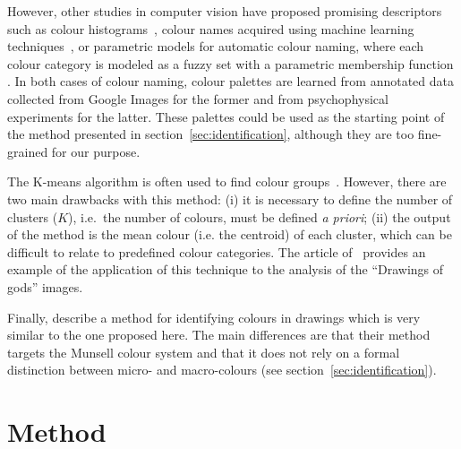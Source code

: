 \documentclass[11pt,a4paper]{article}
\begin{document}
However, other studies in computer vision have proposed promising descriptors such as colour histograms~\cite[see e.g.][]{sun2006}, colour names acquired using machine learning techniques~\cite{weijer2009, lindner2013}, or parametric models for automatic colour naming, where each colour category is modeled as a fuzzy set with a parametric membership function \cite{benavente2008}. In both cases of colour naming, colour palettes are learned from annotated data collected from Google Images for the former and from psychophysical experiments for the latter. These palettes could be used as the starting point of the method presented in section~\ref{sec:identification}, although they are too fine-grained for our purpose.

The K-means algorithm is often used to find colour groups~\cite[see e.g.][]{yendrikhovskij2001,konyushkova2015,hulee2007}. However, there are two main drawbacks with this method: (i) it is necessary to define the number of clusters ($K$), i.e.~the number of colours, must be defined \textit{a priori}; (ii) the output of the method is the mean colour (i.e. the centroid) of each cluster, which can be difficult to relate to predefined colour categories. The article of~\citet{konyushkova2015} provides an example of the application of this technique to the analysis of the ``Drawings of gods'' images.

Finally, \citet{kimbaelee2007} describe a method for identifying colours in drawings which is very similar to the one proposed here. The main differences are that their method targets the Munsell colour system \cite{Munsell1912} and that it does not rely on a formal distinction between micro- and macro-colours (see section~\ref{sec:identification}).


\section{Method}\label{methods}
\label{sec:method}
\end{document}

